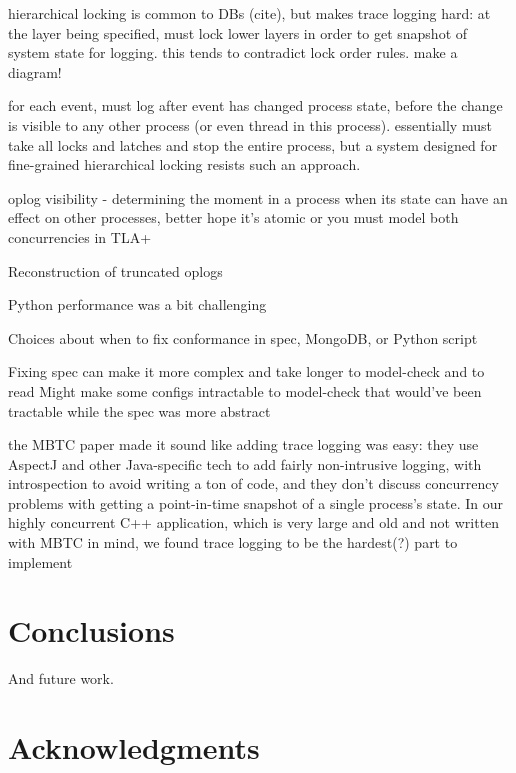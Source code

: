 \documentclass{vldb}
\begin{document}
hierarchical locking is common to DBs (cite), but makes trace logging hard: at the layer being specified, must lock lower layers in order to get snapshot of system state for logging. this tends to contradict lock order rules. make a diagram!

for each event, must log after event has changed process state, before the change is visible to any other process (or even thread in this process). essentially must take all locks and latches and stop the entire process, but a system designed for fine-grained hierarchical locking resists such an approach.

oplog visibility - determining the moment in a process when its state can have an effect on other processes, better hope it's atomic or you must model both concurrencies in TLA+

Reconstruction of truncated oplogs

Python performance was a bit challenging

Choices about when to fix conformance in spec, MongoDB, or Python script

Fixing spec can make it more complex and take longer to model-check and to read
Might make some configs intractable to model-check that would've been tractable while the spec was more abstract

the MBTC paper made it sound like adding trace logging was easy: they use AspectJ and other Java-specific tech to add fairly non-intrusive logging, with introspection to avoid writing a ton of code, and they don't discuss concurrency problems with getting a point-in-time snapshot of a single process's state. In our highly concurrent C++ application, which is very large and old and not written with MBTC in mind, we found trace logging to be the hardest(?) part to implement

\section{Conclusions}
\label{sec:conclusions}

And future work.


\balance

\section{Acknowledgments}
\label{sec:acknolwedgments}
\end{document}
